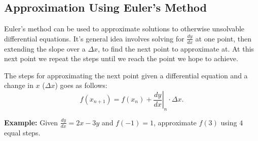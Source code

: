 \documentclass[12pt]{article}
\begin{document}
        \subsection{Approximation Using Euler's Method}
            Euler's method can be used to approximate solutions to otherwise unsolvable differential equations. It's general idea involves solving for $\frac{dy}{dx}$ at one point, then extending the slope over a $\Delta x$, to find the next point to approximate at. At this next point we repeat the steps until we reach the point we hope to achieve.

            The steps for approximating the next point given a differential equation and a change in $x$ ($\Delta x$) goes as follows:
            \[ f(x_{n+1}) = f(x_n) + \left. \frac{dy}{dx} \right \vert_n \cdot \Delta x. \]

            \noindent \textbf{Example:} Given $\frac{dy}{dx} = 2x-3y$ and $f(-1) = 1$, approximate $f(3)$ using $4$ equal steps.
\end{document}
